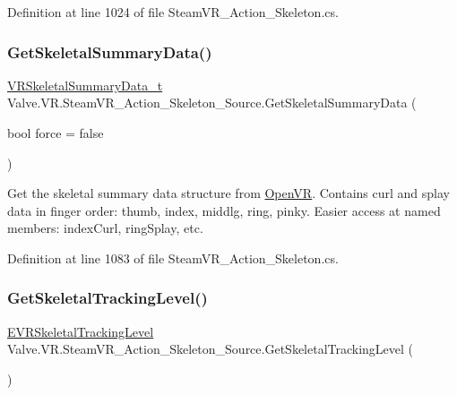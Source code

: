 Definition at line 1024 of file Steam\+V\+R\+\_\+\+Action\+\_\+\+Skeleton.\+cs.

\mbox{\label{class_valve_1_1_v_r_1_1_steam_v_r___action___skeleton___source_a1529fc50cc5aa572625dda77cddf5f6e}} 
\subsubsection{\texorpdfstring{GetSkeletalSummaryData()}{GetSkeletalSummaryData()}}
{\footnotesize\ttfamily \mbox{\hyperlink{struct_valve_1_1_v_r_1_1_v_r_skeletal_summary_data__t}{V\+R\+Skeletal\+Summary\+Data\+\_\+t}} Valve.\+V\+R.\+Steam\+V\+R\+\_\+\+Action\+\_\+\+Skeleton\+\_\+\+Source.\+Get\+Skeletal\+Summary\+Data (\begin{DoxyParamCaption}\item[{bool}]{force = {\ttfamily false} }\end{DoxyParamCaption})\hspace{0.3cm}{\ttfamily [protected]}}



Get the skeletal summary data structure from \mbox{\hyperlink{class_valve_1_1_v_r_1_1_open_v_r}{Open\+VR}}. Contains curl and splay data in finger order\+: thumb, index, middlg, ring, pinky. Easier access at named members\+: index\+Curl, ring\+Splay, etc. 



Definition at line 1083 of file Steam\+V\+R\+\_\+\+Action\+\_\+\+Skeleton.\+cs.

\mbox{\label{class_valve_1_1_v_r_1_1_steam_v_r___action___skeleton___source_a4918503e361bba341ae4314a30150088}} 
\subsubsection{\texorpdfstring{GetSkeletalTrackingLevel()}{GetSkeletalTrackingLevel()}}
{\footnotesize\ttfamily \mbox{\hyperlink{namespace_valve_1_1_v_r_a6f46bd50fb65255d6537ab32a6bddc30}{E\+V\+R\+Skeletal\+Tracking\+Level}} Valve.\+V\+R.\+Steam\+V\+R\+\_\+\+Action\+\_\+\+Skeleton\+\_\+\+Source.\+Get\+Skeletal\+Tracking\+Level (\begin{DoxyParamCaption}{ }\end{DoxyParamCaption})}



